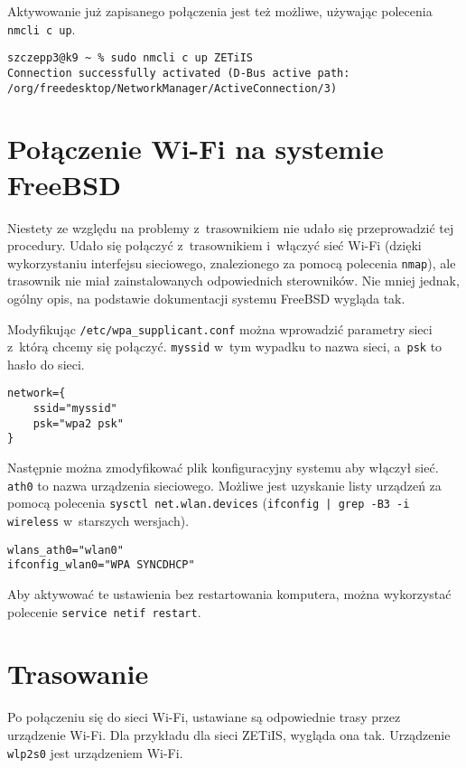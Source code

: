 \documentclass[a4paper,11pt]{article}
\begin{document}
Aktywowanie już zapisanego połączenia jest też możliwe, używając polecenia
\verb|nmcli c up|.

\begin{verbatim}
szczepp3@k9 ~ % sudo nmcli c up ZETiIS
Connection successfully activated (D-Bus active path: /org/freedesktop/NetworkManager/ActiveConnection/3)
\end{verbatim}

\section{Połączenie Wi-Fi na systemie FreeBSD}

Niestety ze względu na problemy z~trasownikiem nie udało się przeprowadzić
tej procedury. Udało się połączyć z~trasownikiem i~włączyć sieć Wi-Fi
(dzięki wykorzystaniu interfejsu sieciowego, znalezionego za pomocą
polecenia \verb|nmap|), ale trasownik nie miał
zainstalowanych odpowiednich sterowników. Nie mniej jednak, ogólny opis,
na podstawie dokumentacji systemu FreeBSD wygląda tak.

Modyfikując \verb|/etc/wpa_supplicant.conf| można wprowadzić parametry
sieci z~którą chcemy się połączyć. \verb|myssid| w~tym wypadku to nazwa sieci,
a~\verb|psk| to hasło do sieci.

\begin{verbatim}
network={
    ssid="myssid"
    psk="wpa2 psk"
}
\end{verbatim}

Następnie można zmodyfikować plik konfiguracyjny systemu aby włączył sieć.
\verb|ath0| to nazwa urządzenia sieciowego. Możliwe jest uzyskanie listy
urządzeń za pomocą polecenia \verb|sysctl net.wlan.devices|
(\verb/ifconfig | grep -B3 -i wireless/ w~starszych wersjach).

\begin{verbatim}
wlans_ath0="wlan0"
ifconfig_wlan0="WPA SYNCDHCP"
\end{verbatim}

Aby aktywować te ustawienia bez restartowania komputera, można wykorzystać
polecenie \verb|service netif restart|.

\section{Trasowanie}

Po połączeniu się do sieci Wi-Fi, ustawiane są odpowiednie trasy
przez urządzenie Wi-Fi. Dla przykładu dla sieci ZETiIS, wygląda
ona tak. Urządzenie \verb|wlp2s0| jest urządzeniem Wi-Fi.
\end{document}
